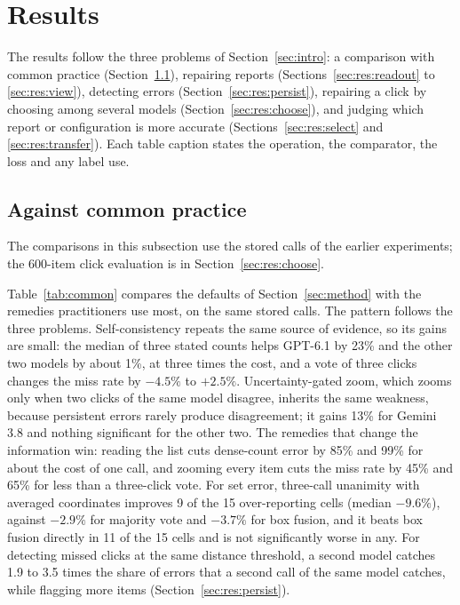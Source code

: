 \section{Results}\label{sec:results}

The results follow the three problems of Section~\ref{sec:intro}: a comparison with common practice (Section~\ref{sec:res:common}), repairing reports (Sections~\ref{sec:res:readout} to \ref{sec:res:view}), detecting errors (Section~\ref{sec:res:persist}), repairing a click by choosing among several models (Section~\ref{sec:res:choose}), and judging which report or configuration is more accurate (Sections~\ref{sec:res:select} and \ref{sec:res:transfer}). Each table caption states the operation, the comparator, the loss and any label use.

\subsection{Against common practice}\label{sec:res:common}



The comparisons in this subsection use the stored calls of the earlier experiments; the 600-item click evaluation is in Section~\ref{sec:res:choose}.

Table~\ref{tab:common} compares the defaults of Section~\ref{sec:method} with the remedies practitioners use most, on the same stored calls. The pattern follows the three problems. Self-consistency repeats the same source of evidence, so its gains are small: the median of three stated counts helps GPT-6.1 by 23\% and the other two models by about 1\%, at three times the cost, and a vote of three clicks changes the miss rate by $-4.5\%$ to $+2.5\%$. Uncertainty-gated zoom, which zooms only when two clicks of the same model disagree, inherits the same weakness, because persistent errors rarely produce disagreement; it gains 13\% for Gemini 3.8 and nothing significant for the other two. The remedies that change the information win: reading the list cuts dense-count error by 85\% and 99\% for about the cost of one call, and zooming every item cuts the miss rate by 45\% and 65\% for less than a three-click vote. For set error, three-call unanimity with averaged coordinates improves 9 of the 15 over-reporting cells (median $-9.6\%$), against $-2.9\%$ for majority vote and $-3.7\%$ for box fusion, and it beats box fusion directly in 11 of the 15 cells and is not significantly worse in any. For detecting missed clicks at the same distance threshold, a second model catches 1.9 to 3.5 times the share of errors that a second call of the same model catches, while flagging more items (Section~\ref{sec:res:persist}).

